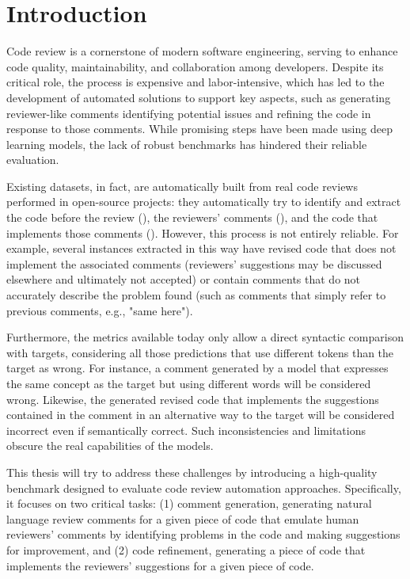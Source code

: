 \section{Introduction}
Code review is a cornerstone of modern software engineering, serving to enhance
code quality, maintainability, and collaboration among developers. Despite its critical
role, the process is expensive and labor-intensive, which has led to the development
of automated solutions to support key aspects, such as generating reviewer-like
comments identifying potential issues and refining the code in response to those comments.
While promising steps have been made using deep learning models, the lack of robust
benchmarks has hindered their reliable evaluation.

Existing datasets, in fact, are automatically built from real code reviews
performed in open-source projects: they automatically try to identify and
extract the code before the review (\subCode), the reviewers' comments
(\revComment), and the code that implements those comments (\revCode). However,
this process is not entirely reliable. For example, several instances extracted
in this way have revised code that does not implement the associated comments
(reviewers' suggestions may be discussed elsewhere and ultimately not accepted)
or contain comments that do not accurately describe the problem found (such as
comments that simply refer to previous comments, e.g., "same here").

Furthermore, the metrics available today only allow a direct syntactic comparison with targets,
considering all those predictions that use different tokens than the target as wrong. For instance,
a comment generated by a model that expresses the same concept as the target but using
different words will be considered wrong. Likewise, the generated revised code that implements
the suggestions contained in the comment in an alternative way to the target will be considered
incorrect even if semantically correct.
Such inconsistencies and limitations obscure the real capabilities of the models.


This thesis will try to address these challenges by introducing a high-quality
benchmark designed to evaluate code review automation approaches.
Specifically, it focuses on two critical tasks: (1) comment generation, \ie
generating natural language review comments for a given piece of code that emulate
human reviewers' comments by identifying problems in the code and making suggestions
for improvement, and (2) code refinement, \ie generating a piece of code that
implements the reviewers' suggestions for a given piece of code.

